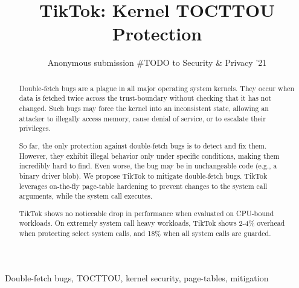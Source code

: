 \documentclass[conference]{IEEEtran}
\newcommand{\sysname}{TikTok}
\newcommand{\roughevaloverheadbad}{18\%}
\newcommand{\roughevaloverheadbetter}{2-4\%}
\begin{document}

\date{}

\title{\Large \bf TikTok: Kernel TOCTTOU Protection}

\author{
Anonymous submission \#TODO to Security \& Privacy '21
} %

\maketitle

\begin{abstract}

Double-fetch bugs are a plague in all major operating system kernels.  They
occur when data is fetched twice across the trust-boundary without checking that
it has not changed. Such bugs may force the kernel into an inconsistent state,
allowing an attacker to illegally access memory, cause denial of service, or to
escalate their privileges.

So far, the only protection against double-fetch bugs is to detect and fix them.
However, they exhibit illegal behavior only under specific conditions, making
them incredibly hard to find. Even worse, the bug may be in unchangeable code
(e.g., a binary driver blob).
%
We propose \sysname{} to mitigate double-fetch bugs.  \sysname{} leverages
on-the-fly page-table hardening to prevent changes to the system call arguments,
while the system call executes.

\sysname{} shows no noticeable drop in performance when evaluated on CPU-bound
workloads. On extremely system call heavy workloads, \sysname{} shows
\roughevaloverheadbetter{} overhead when protecting select system calls, and
\roughevaloverheadbad{} when all system calls are guarded.


\end{abstract}

\begin{IEEEkeywords}
Double-fetch bugs, TOCTTOU, kernel security, page-tables, mitigation
\end{IEEEkeywords}
\end{document}
